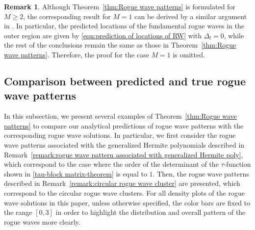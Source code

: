 \documentclass[preprint,3p,10pt]{elsarticle}
\theoremstyle{definition}
\newtheorem{remark}{Remark}[section]
\begin{document}
\begin{remark}
Although Theorem~\ref{thm:Rogue wave patterns} is formulated for \(M\ge 2\), the corresponding result for $M=1$ can be derived by a similar argument in \cite{yang2021rogue,yang2021universal}. In particular, the predicted locations of the fundamental rogue waves in the outer region are given by \eqref{eqn:prediction of locations of RW} with \(\Delta_l=0\), while the rest of the conclusions remain the same as  those in Theorem~\ref{thm:Rogue wave patterns}. Therefore, the proof for the case \(M=1\) is omitted.
\end{remark}

\subsection{Comparison between predicted and true rogue wave patterns}\label{sec:Comparison between predicted and true rogue wave patterns}
In this subsection, we present several examples of Theorem~\ref{thm:Rogue wave patterns} to compare our analytical predictions of rogue wave patterns with the corresponding rogue wave solutions. In particular, we first consider the rogue wave patterns associated with the generalized Hermite polynomials described in Remark~\ref{remark:rogue wave pattern associated with generalized Hermite poly}, which correspond to the case where the order of the determinant of the $\tau$-function shown in \eqref{tau-block matrix-theorem} is equal to $1$. Then, the rogue wave patterns described in Remark~\ref{remark:circular rogue wave cluster} are presented, which correspond to the circular rogue wave clusters. 
For all density plots of the rogue wave solutions in this paper, unless otherwise specified, the color bars are fixed to the range $[0,3]$ in order to highlight the distribution and overall pattern of the rogue waves more clearly.
\end{document}
